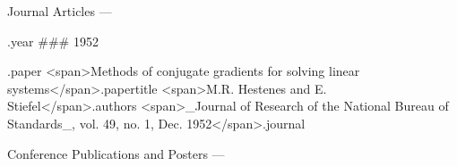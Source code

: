 Journal Articles
---

{.year}
### 1952

{.paper}
<span>Methods of conjugate gradients for solving linear systems</span>{.papertitle}  
<span>M.R. Hestenes and E. Stiefel</span>{.authors}  
<span>_Journal of Research of the National Bureau of Standards_, vol. 49, no. 1, Dec. 1952</span>{.journal}  

Conference Publications and Posters
---
